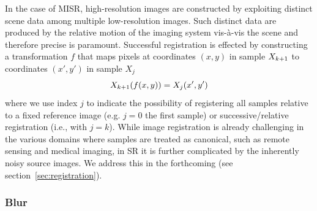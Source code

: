 In the case of MISR, high-resolution images are constructed by exploiting distinct scene data among multiple low-resolution images.
%
Such distinct data are produced by the relative motion of the imaging system vis-à-vis the scene and therefore precise  is paramount.
%
Successful registration is effected by constructing a transformation \(f\) that maps pixels at coordinates \((x,y)\) in sample \(X_{k+1}\) to coordinates \((x',y')\) in sample \(X_j\)
\begin{equation}
	X_{k+1}(f(x, y)) = X_j(x',y')
	\label{eqn:registration}
\end{equation}
where we use index \(j\) to indicate the possibility of registering all samples relative to a fixed reference image (e.g. \(j=0\) the first sample) or successive/relative registration (i.e., with \(j=k\)).
%
While image registration is already challenging in the various domains where samples are treated as canonical, such as remote sensing and medical imaging, in SR it is further complicated by the inherently noisy source images. 
%
We address this in the forthcoming (see section~\ref{sec:registration}).

\subsubsection{Blur}


